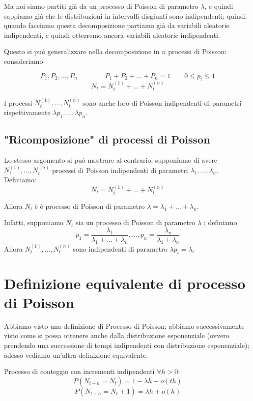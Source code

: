 \documentclass[a4paper,12pt]{book}
\begin{document}
Ma noi siamo partiti già da un processo di Poisson di parametro $\lambda$, e quindi sappiamo già che le distribuzioni in intervalli disgiunti sono indipendenti; quindi quando facciamo questa decomposizione partiamo già da variabili aleatorie indipendenti, e quindi otterremo ancora variabili aleatorie indipendenti. 

Questo si può generalizzare nella decomposizione in $ n $ processi di Poisson: consideriamo

$$ P_1, P_2, ..., P_n \qquad \qquad P_1 + P_2 + ... + P_n  = 1 \qquad 0 \le p_i \le 1 $$
$$ N_t = N_t^{(1)} + ... + N_t^{(n)} $$

I processi $ N_t^{(1)}, ..., N_t^{(n)} $ sono anche loro di Poisson indipendenti di parametri rispettivamente $ \lambda p_1, ..., \lambda p_n $.

\subsection{"Ricomposizione" di processi di Poisson}
Lo stesso argomento si può mostrare al contrario: supponiamo di avere $ N_t^{(1)}, ..., N_t^{(n)} $ processi di Poisson indipendenti di parametri $ \lambda_{1}, ..., \lambda_{n} $. Definiamo:
$$ N_t = N_t^{(1)} + ... + N_t^{(n)} $$

Allora $ N_t $ è è processo di Poisson di parametro $ \lambda = \lambda_{1} + ... + \lambda_{n} $.

Infatti, supponiamo $ N_t $ sia un processo di Poisson di parametro $ \lambda $ %
; definiamo 
$$ p_1  = \frac{\lambda_1}{\lambda_1 + ... + \lambda_{n}}, ... , p_n = \frac{\lambda_{n}}{\lambda_{1} + \lambda_{n}}$$
Allora $ N_t^{(1)}, ..., N_t^{(n)} $ sono indipendenti di parametro $\lambda p_i = \lambda_{i}$

\section{Definizione equivalente di processo di Poisson}
Abbiamo visto una definizione di Processo di Poisson; abbiamo successivamente visto come si possa ottenere anche dalla distribuzione esponenziale (ovvero prendendo una successione di tempi indipendenti con distribuzione esponenziale); adesso vediamo un'altra definizione equivalente.

Processo di conteggio con incrementi indipendenti $\forall h > 0$:
$$ P(N_{t + h} = N_t) = 1 - \lambda h + o(th) $$
$$ P(N_{t + h} = N_t + 1) = \lambda h + o(h) $$
\end{document}
